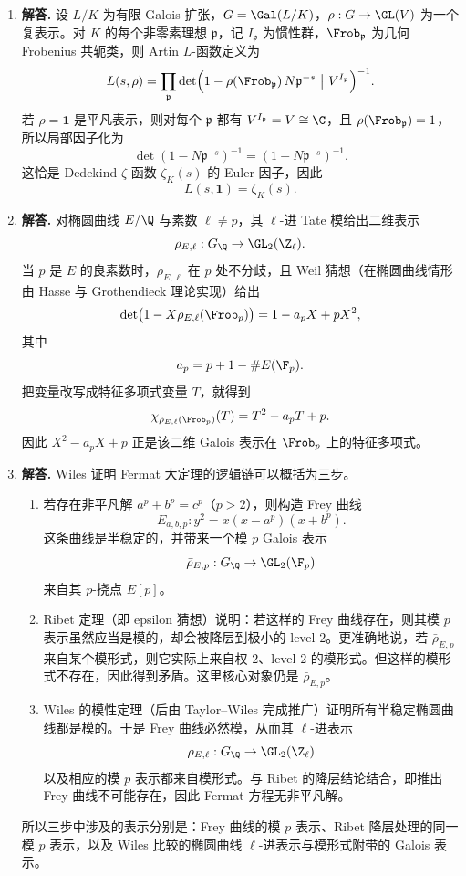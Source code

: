 \begin{enumerate}[label=\textbf{\arabic*.}, leftmargin=*, itemsep=1em]
\item \textbf{解答.} 设 $L/K$ 为有限 Galois 扩张，$G=\Gal(L/K)$，$\rho:G\to\GL(V)$ 为一个复表示。对 $K$ 的每个非零素理想 $\mathfrak p$，记 $I_{\mathfrak p}$ 为惯性群，$\Frob_{\mathfrak p}$ 为几何 Frobenius 共轭类，则 Artin $L$-函数定义为
\[
L(s,\rho)=\prod_{\mathfrak p}\det\Bigl(1-\rho(\Frob_{\mathfrak p})\,N\mathfrak p^{-s}\ \big|\ V^{I_{\mathfrak p}}\Bigr)^{-1}.
\]
若 $\rho=\mathbf 1$ 是平凡表示，则对每个 $\mathfrak p$ 都有 $V^{I_{\mathfrak p}}=V\cong\C$，且 $\rho(\Frob_{\mathfrak p})=1$，所以局部因子化为
\[
\det(1-N\mathfrak p^{-s})^{-1}=(1-N\mathfrak p^{-s})^{-1}.
\]
这恰是 Dedekind $\zeta$-函数 $\zeta_K(s)$ 的 Euler 因子，因此
\[
L(s,\mathbf1)=\zeta_K(s).
\]

\item \textbf{解答.} 对椭圆曲线 $E/\Q$ 与素数 $\ell\neq p$，其 $\ell$-进 Tate 模给出二维表示
\[
\rho_{E,\ell}:G_{\Q}\to\GL_2(\Z_\ell).
\]
当 $p$ 是 $E$ 的良素数时，$\rho_{E,\ell}$ 在 $p$ 处不分歧，且 Weil 猜想（在椭圆曲线情形由 Hasse 与 Grothendieck 理论实现）给出
\[
\det\bigl(1-X\rho_{E,\ell}(\Frob_p)\bigr)=1-a_pX+pX^2,
\]
其中
\[
a_p=p+1-\#E(\F_p).
\]
把变量改写成特征多项式变量 $T$，就得到
\[
\chi_{\rho_{E,\ell}(\Frob_p)}(T)=T^2-a_pT+p.
\]
因此 $X^2-a_pX+p$ 正是该二维 Galois 表示在 $\Frob_p$ 上的特征多项式。

\item \textbf{解答.} Wiles 证明 Fermat 大定理的逻辑链可以概括为三步。
\begin{enumerate}[label=\normalfont(\arabic*), leftmargin=2.5em]
\item 若存在非平凡解 $a^p+b^p=c^p$（$p>2$），则构造 Frey 曲线
\[
E_{a,b,p}: y^2=x(x-a^p)(x+b^p).
\]
这条曲线是半稳定的，并带来一个模 $p$ Galois 表示
\[
\bar\rho_{E,p}:G_{\Q}\to\GL_2(\F_p)
\]
来自其 $p$-挠点 $E[p]$。
\item Ribet 定理（即 epsilon 猜想）说明：若这样的 Frey 曲线存在，则其模 $p$ 表示虽然应当是模的，却会被降层到极小的 level $2$。更准确地说，若 $\bar\rho_{E,p}$ 来自某个模形式，则它实际上来自权 $2$、level $2$ 的模形式。但这样的模形式不存在，因此得到矛盾。这里核心对象仍是 $\bar\rho_{E,p}$。
\item Wiles 的模性定理（后由 Taylor--Wiles 完成推广）证明所有半稳定椭圆曲线都是模的。于是 Frey 曲线必然模，从而其 $\ell$-进表示
\[
\rho_{E,\ell}:G_{\Q}\to\GL_2(\Z_\ell)
\]
以及相应的模 $p$ 表示都来自模形式。与 Ribet 的降层结论结合，即推出 Frey 曲线不可能存在，因此 Fermat 方程无非平凡解。
\end{enumerate}
所以三步中涉及的表示分别是：Frey 曲线的模 $p$ 表示、Ribet 降层处理的同一模 $p$ 表示，以及 Wiles 比较的椭圆曲线 $\ell$-进表示与模形式附带的 Galois 表示。


\end{enumerate}
